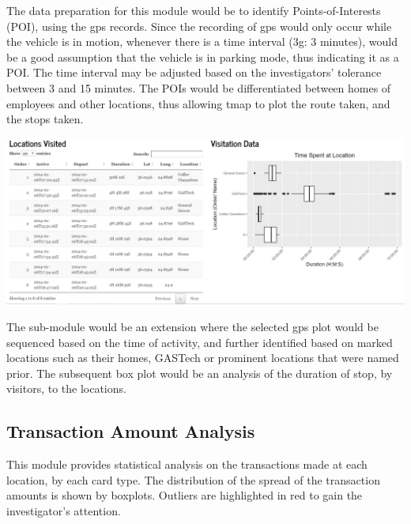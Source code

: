 \documentclass{acm_proc_article-sp}
\begin{document}
The data preparation for this module would be to identify
Points-of-Interests (POI), using the gps records. Since the recording of
gps would only occur while the vehicle is in motion, whenever there is a
time interval (3g: 3 minutes), would be a good assumption that the
vehicle is in parking mode, thus indicating it as a POI. The time
interval may be adjusted based on the investigators' tolerance between 3
and 15 minutes. The POIs would be differentiated between homes of
employees and other locations, thus allowing tmap to plot the route
taken, and the stops taken.

\includegraphics{img/Movement2.PNG}

The sub-module would be an extension where the selected gps plot would
be sequenced based on the time of activity, and further identified based
on marked locations such as their homes, GASTech or prominent locations
that were named prior. The subsequent box plot would be an analysis of
the duration of stop, by visitors, to the locations.

\hypertarget{transaction-amount-analysis}{%
\subsection{Transaction Amount
Analysis}\label{transaction-amount-analysis}}

This module provides statistical analysis on the transactions made at
each location, by each card type. The distribution of the spread of the
transaction amounts is shown by boxplots. Outliers are highlighted in
red to gain the investigator's attention.
\end{document}

